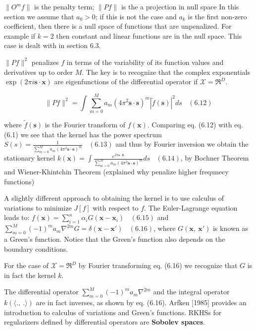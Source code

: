 \documentclass[
  ignorenonframetext,
]{beamer}
\begin{document}
\begin{frame}{\(\|O^mf\|\) is the penalty term; \(\|Pf\|\) is the a
projection in null space}
\protect\hypertarget{omf-is-the-penalty-term-pf-is-the-a-projection-in-null-space}{}
In this section we assume that \(a_0 > 0\); if this is not the case and
\(a_k\) is the first non-zero coefficient, then there is a null space of
functions that are unpenalized. For example if \(k = 2\) then constant
and linear functions are in the null space. This case is dealt with in
section 6.3.

\(\|P f\|^2\) penalizes \(f\) in terms of the variability of its
function values and derivatives up to order \(M\). The key is to
recognize that the complex exponentials
\(\exp(2\pi i \pmb s \cdot \pmb x)\) are eigenfunctions of the
differential operator if \(\mathcal X = \mathfrak R^D\).
\end{frame}

\begin{frame}{}
\protect\hypertarget{section-7}{}
\[
\|P f\|^2 = \int \sum^M_{m=0} a_m(4\pi^2 \pmb s \cdot \pmb s)^m |\tilde f(\pmb s)|^2 ds \ \ \ \ (6.12)
\]

where \(\tilde f(\pmb s)\) is the Fourier transform of \(f(\pmb x)\).
Comparing eq. (6.12) with eq. (6.1) we see that the kernel has the power
spectrum
\(S(s) = \frac 1 {\sum^M_{m=0} a_m (4\pi^2 \pmb s \cdot \pmb s)^m} \ \ \ \  (6.13)\)
and thus by Fourier inversion we obtain the stationary kernel
\(k(\pmb x) = \int \frac {e^{2\pi \pmb s \cdot \pmb x}} {\sum^M_{m=0} a_m(4\pi^2 \pmb s \cdot \pmb s)^m} ds\ \ \ \ (6.14)\),
by Bochner Theorem and Wiener-Khintchin Theorem (explained why penalize
higher frequnecy functions)
\end{frame}

\begin{frame}{}
\protect\hypertarget{section-8}{}
A slightly different approach to obtaining the kernel is to use calculus
of variations to minimize \(J[f]\) with respect to \(f\). The
Euler-Lagrange equation leads to:
\(f(\pmb x) = \sum^n_{i=1} \alpha_i G(\pmb x − \pmb x_i)\ \ \ \ (6.15)\)
and
\(\sum^M_{m =0} (−1)^m a_m \nabla^{2m} G = \delta (\pmb x − \pmb x')\ \ \ \ (6.16)\),
where \(G(\pmb x,\  \pmb x')\) is known as a Green's function. Notice
that the Green's function also depends on the boundary conditions.

For the case of \(\mathcal X = \mathfrak R^D\) by Fourier transforming
eq. (6.16) we recognize that \(G\) is in fact the kernel \(k\).

The differential operator \(\sum^M_ {m=0} (−1)^m a_m \nabla ^{2m}\) and
the integral operator \(k(\langle .,\ .\rangle)\) are in fact inverses,
as shown by eq. (6.16). Arfken {[}1985{]} provides an introduction to
calculus of variations and Green's functions. RKHSs for regularizers
defined by differential operators are \textbf{Sobolev spaces}.
\end{frame}
\end{document}
